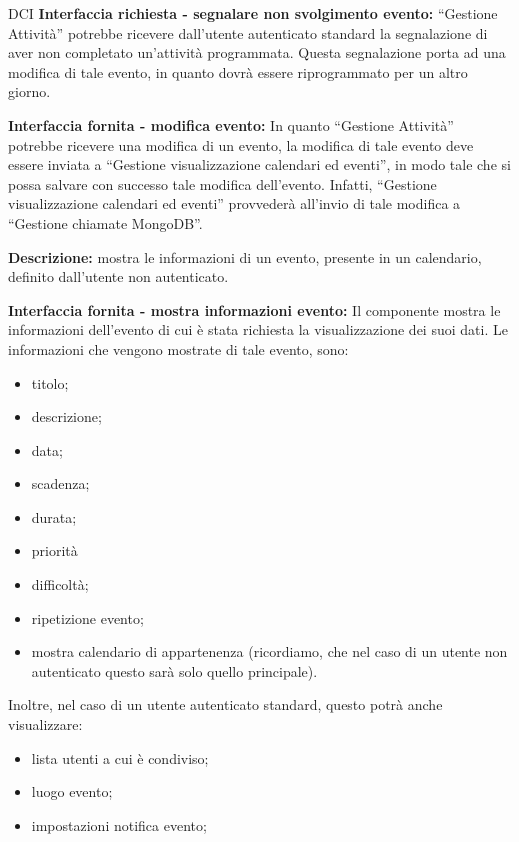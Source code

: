 \begin{listaPersonale}{DCI}
    \textbf{Interfaccia richiesta - segnalare non svolgimento evento:} “Gestione Attività” potrebbe ricevere dall'utente autenticato standard la segnalazione di aver non completato un'attività programmata.  Questa segnalazione porta ad una modifica di tale evento, in quanto dovrà essere riprogrammato per un altro giorno.

    \textbf{Interfaccia fornita - modifica evento:} In quanto “Gestione Attività” potrebbe ricevere una modifica di un evento, la modifica di tale evento deve essere inviata a “Gestione visualizzazione calendari ed eventi”, in modo tale che si possa salvare con successo tale modifica dell'evento. Infatti, “Gestione visualizzazione calendari ed eventi” provvederà all'invio di tale modifica a “Gestione chiamate MongoDB”.



    \textbf{Descrizione:} mostra le informazioni di un evento, presente in un calendario, definito dall'utente non autenticato.

    \textbf{Interfaccia fornita - mostra informazioni evento:} Il componente mostra le informazioni dell'evento di cui è stata richiesta la visualizzazione dei suoi dati. Le informazioni che vengono mostrate di tale evento, sono:
    \begin{itemize}
        \item titolo;
        \item descrizione;
        \item data;
        \item scadenza;
        \item durata;
        \item priorità
        \item difficoltà;
        \item ripetizione evento;
        \item mostra calendario di appartenenza (ricordiamo, che nel caso di un utente non autenticato questo sarà solo quello principale).
    \end{itemize}
    Inoltre, nel caso di un utente autenticato standard, questo potrà anche visualizzare:
    \begin{itemize}
        \item lista utenti a cui è condiviso;
        \item luogo evento;
        \item impostazioni notifica evento;
    \end{itemize}



\end{listaPersonale}
